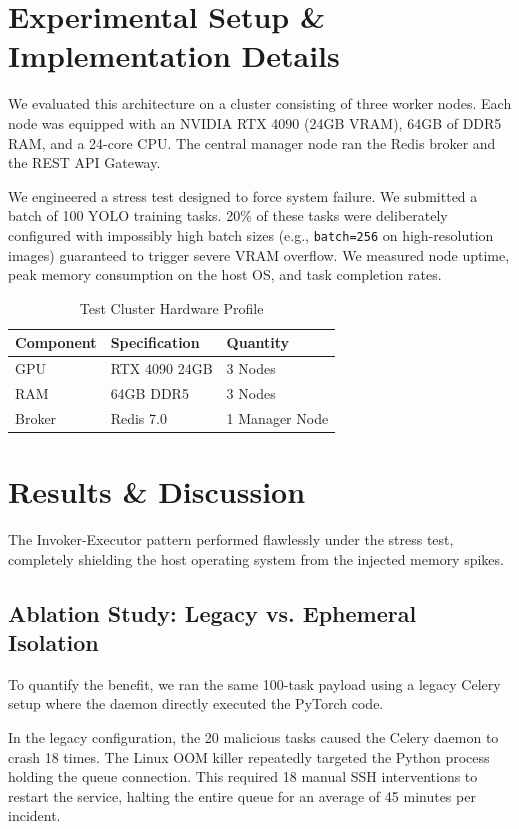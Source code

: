 \documentclass[10pt,twocolumn,letterpaper]{article}
\begin{document}
\section{Experimental Setup \& Implementation Details}
We evaluated this architecture on a cluster consisting of three worker nodes. Each node was equipped with an NVIDIA RTX 4090 (24GB VRAM), 64GB of DDR5 RAM, and a 24-core CPU. The central manager node ran the Redis broker and the REST API Gateway.

We engineered a stress test designed to force system failure. We submitted a batch of 100 YOLO training tasks. 20\% of these tasks were deliberately configured with impossibly high batch sizes (e.g., \texttt{batch=256} on high-resolution images) guaranteed to trigger severe VRAM overflow. We measured node uptime, peak memory consumption on the host OS, and task completion rates.

\begin{table}[htbp]
\centering
\caption{Test Cluster Hardware Profile}
\label{tab:hardware}
\begin{tabular}{@{}lll@{}}
\toprule
Component & Specification & Quantity \\ \midrule
GPU & RTX 4090 24GB & 3 Nodes \\
RAM & 64GB DDR5 & 3 Nodes \\
Broker & Redis 7.0 & 1 Manager Node \\ \bottomrule
\end{tabular}
\end{table}

\section{Results \& Discussion}
The Invoker-Executor pattern performed flawlessly under the stress test, completely shielding the host operating system from the injected memory spikes.

\subsection{Ablation Study: Legacy vs. Ephemeral Isolation}
To quantify the benefit, we ran the same 100-task payload using a legacy Celery setup where the daemon directly executed the PyTorch code. 

In the legacy configuration, the 20 malicious tasks caused the Celery daemon to crash 18 times. The Linux OOM killer repeatedly targeted the Python process holding the queue connection. This required 18 manual SSH interventions to restart the service, halting the entire queue for an average of 45 minutes per incident.
\end{document}

